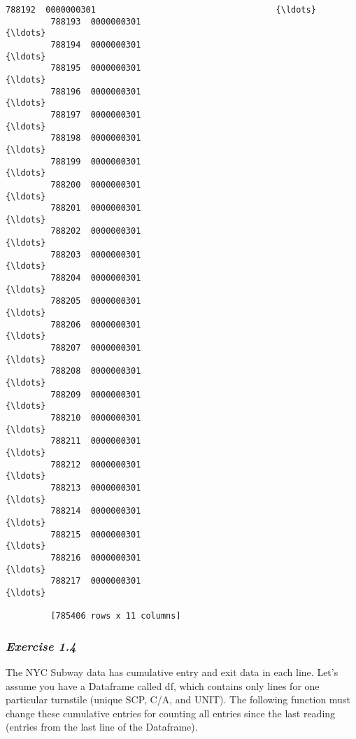 \documentclass[11pt]{article}
\begin{document}
\begin{Verbatim}[commandchars=\\\{\}]
         788192  0000000301                                    {\ldots}  
         788193  0000000301                                    {\ldots}  
         788194  0000000301                                    {\ldots}  
         788195  0000000301                                    {\ldots}  
         788196  0000000301                                    {\ldots}  
         788197  0000000301                                    {\ldots}  
         788198  0000000301                                    {\ldots}  
         788199  0000000301                                    {\ldots}  
         788200  0000000301                                    {\ldots}  
         788201  0000000301                                    {\ldots}  
         788202  0000000301                                    {\ldots}  
         788203  0000000301                                    {\ldots}  
         788204  0000000301                                    {\ldots}  
         788205  0000000301                                    {\ldots}  
         788206  0000000301                                    {\ldots}  
         788207  0000000301                                    {\ldots}  
         788208  0000000301                                    {\ldots}  
         788209  0000000301                                    {\ldots}  
         788210  0000000301                                    {\ldots}  
         788211  0000000301                                    {\ldots}  
         788212  0000000301                                    {\ldots}  
         788213  0000000301                                    {\ldots}  
         788214  0000000301                                    {\ldots}  
         788215  0000000301                                    {\ldots}  
         788216  0000000301                                    {\ldots}  
         788217  0000000301                                    {\ldots}  
         
         [785406 rows x 11 columns]
\end{Verbatim}
            
    \subsubsection{\texorpdfstring{\emph{Exercise
1.4}}{Exercise 1.4}}\label{exercise-1.4}

The NYC Subway data has cumulative entry and exit data in each line.
Let's assume you have a Dataframe called df, which contains only lines
for one particular turnstile (unique SCP, C/A, and UNIT). The following
function must change these cumulative entries for counting all entries
since the last reading (entries from the last line of the Dataframe).
\end{document}
